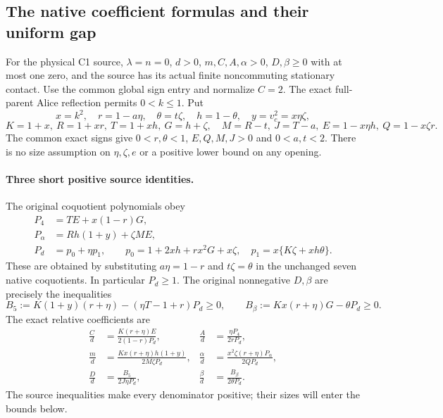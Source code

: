 \subsection{The native coefficient formulas and their uniform gap}

\label{component:p42ee07a067c1}

\label{p42ee07a067c1:sec:c1-global-native-cap}

For the physical C1 source, $\lambda=n=0$, $d>0$, $m,C,A,\alpha>0$,
$D,\beta\ge0$ with at most one zero, and the source has its actual
finite noncommuting stationary contact. Use the common global sign
entry and normalize $C=2$. The exact full-parent Alice reflection
permits $0<k\le1$. Put
\[
 x=k^2,\quad r=1-a\eta,\quad\theta=t\zeta,\quad
 h=1-\theta,\quad y=v_c^2=x\eta\zeta,
\]
\[
 K=1+x,\ R=1+xr,\ T=1+xh,\ G=h+\zeta,
 \quad M=R-t,\ J=T-a,\ E=1-x\eta h,\ Q=1-x\zeta r.
 \tag{NC1}
\]
The common exact signs give $0<r,\theta<1$, $E,Q,M,J>0$ and
$0<a,t<2$. There is no size assumption on $\eta,\zeta,e$ or a
positive lower bound on any opening.

\paragraph{Three short positive source identities.}
The original coquotient polynomials obey
\begin{align*}
 P_4&=TE+x(1-r)G,\\
 P_\alpha&=Rh(1+y)+\zeta ME,\\
 P_d&=p_0+\eta p_1,\qquad
 p_0=1+2xh+rx^2G+x\zeta,\quad
 p_1=x\{K\zeta+xh\theta\}.
 \tag{NC2}
\end{align*}
These are obtained by substituting $a\eta=1-r$ and $t\zeta=\theta$
in the unchanged seven native coquotients. In particular $P_d\ge1$.
The original nonnegative $D,\beta$ are precisely the inequalities
\[
 B_5:=K(1+y)(r+\eta)-(\eta T-1+r)P_d\ge0,
 \qquad B_\beta:=Kx(r+\eta)G-\theta P_d\ge0.
 \tag{NC3}
\]
The exact relative coefficients are
\begin{align*}
 \frac C d&=\frac{K(r+\eta)E}{2(1-r)P_d},&
 \frac A d&=\frac{\eta P_4}{2rP_d},\\
 \frac m d&=\frac{Kx(r+\eta)h(1+y)}{2M\zeta P_d},&
 \frac\alpha d&=\frac{x^2\zeta(r+\eta)P_\alpha}{2QP_d},\\
 \frac Dd&=\frac{B_5}{2J\eta P_d},&
 \frac\beta d&=\frac{B_\beta}{2\theta P_d}.
 \tag{NC4}
\end{align*}
The source inequalities make every denominator positive; their sizes
will enter the bounds below.

